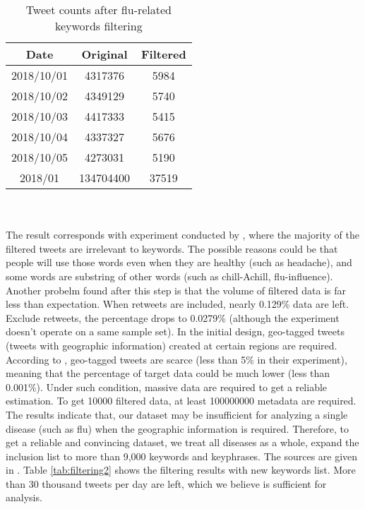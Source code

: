 \begin{table}[!htbp]
    \centering
    \hspace{0.5cm}
    \begin{tabular}{ccc}
        Date & Original & Filtered \\ \hline
        2018/10/01 & 4317376 & 5984 \\
        2018/10/02 & 4349129 & 5740 \\
        2018/10/03 & 4417333 & 5415 \\
        2018/10/04 & 4337327 & 5676 \\
        2018/10/05 & 4273031 & 5190 \\
        2018/01 & 134704400 & 37519 \\
    \end{tabular}
    \caption{Tweet counts after flu-related keywords filtering}
    \label{tab:filtering}
\end{table}
\\\\
The result corresponds with experiment conducted by \cite{culotta2010towards}, where the majority of the filtered tweets are irrelevant to keywords. The possible reasons could be that people will use those words even when they are healthy (such as headache), and some words are substring of other words (such as chill-Achill, flu-influence). Another probelm found after this step is that the volume of filtered data is far less than expectation. When retweets are included, nearly 0.129\% data are left. Exclude retweets, the percentage drops to 0.0279\% (although the experiment doesn't operate on a same sample set). In the initial design, geo-tagged tweets (tweets with geographic information) created at certain regions are required. According to \cite{sloan}, geo-tagged tweets are scarce (less than 5\% in their experiment), meaning that the percentage of target data could be much lower (less than 0.001\%). Under such condition, massive data are required to get a reliable estimation. To get 10000 filtered data, at least 100000000 metadata are required. The results indicate that, our dataset may be insufficient for analyzing a single disease (such as flu) when the geographic information is required. Therefore, to get a reliable and convincing dataset, we treat all diseases as a whole, expand the inclusion list to more than 9,000 keywords and keyphrases. The sources are given in \cite{paul2011you}. Table \ref{tab:filtering2} shows the filtering results with new keywords list. More than 30 thousand tweets per day are left, which we believe is sufficient for analysis.
